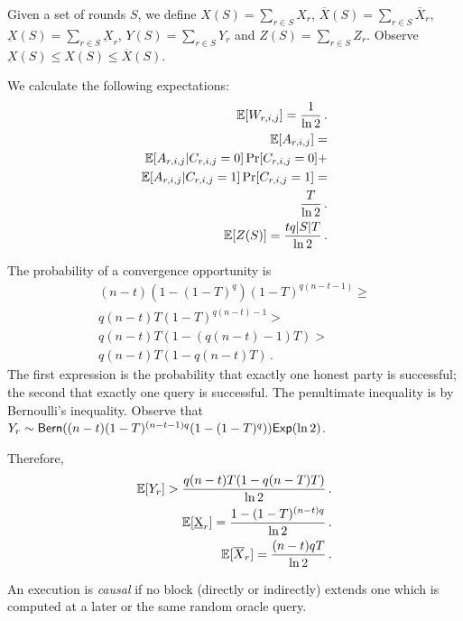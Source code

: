 Given a set of rounds $S$, we define
$X(S) = \sum_{r \in S} X_r$,
$\overline{X}(S) = \sum_{r \in S} \overline{X}_r$,
$\underbar{X}(S) = \sum_{r \in S} \underbar{X}_r$,
$Y(S) = \sum_{r \in S} Y_r$
and $Z(S) = \sum_{r \in S} Z_r$.
Observe $\underbar{X}(S) \leq X(S) \leq \overline{X}(S)$.

We calculate the following expectations:
\begin{align*}
  \mathop{{}\mathbb{E}}[W_{r, i, j}] = \frac{1}{\ln2}\,.\\
  \mathop{{}\mathbb{E}}[A_{r, i, j}] =\\
  \mathop{{}\mathbb{E}}[A_{r, i, j} | C_{r, i, j} = 0] \Pr[C_{r, i, j} = 0] +\\
  \mathop{{}\mathbb{E}}[A_{r, i, j} | C_{r, i, j} = 1] \Pr[C_{r, i, j} = 1] =\\
  \frac{T}{\ln2}\,.\\
  \mathop{{}\mathbb{E}}[Z(S)] =
  \frac{tq|S| T}{\ln2}\,.
\end{align*}

The probability of a convergence opportunity is
\begin{align*}
  (n - t) (1 - (1 - T)^q) (1 - T)^{q(n - t - 1)} \geq \\
  q(n - t) T (1 - T)^{q(n - t) - 1} > \\
  q(n - t) T (1 - (q(n - t) - 1)T) > \\
  q(n - t) T (1 - q(n - t)T)\,.
\end{align*}
The first expression is the probability that exactly one honest party is successful;
the second that exactly one query is successful. The penultimate inequality is by
Bernoulli's inequality.
Observe that $Y_r \sim \textsf{Bern}((n - t)(1 - T)^{(n - t - 1)q}(1 - (1 - T)^q)) \textsf{Exp}(\ln 2)$.

Therefore,
\begin{align*}
  \mathop{{}\mathbb{E}}[Y_r] > \frac{q(n - t)T(1 - q(n - T)T)}{\ln2}\,.\\
  \mathop{{}\mathbb{E}}[\underbar{X}_r] = \frac{1 - (1 - T)^{(n - t)q}}{\ln2}\,.\\
  \mathop{{}\mathbb{E}}[\overline{X}_r] = \frac{(n - t)qT}{\ln2}\,.
\end{align*}

\begin{definition}[Causality]
  An execution is \emph{causal} if no block (directly or indirectly) extends
  one which is computed at a later or the same random oracle query.
\end{definition}

